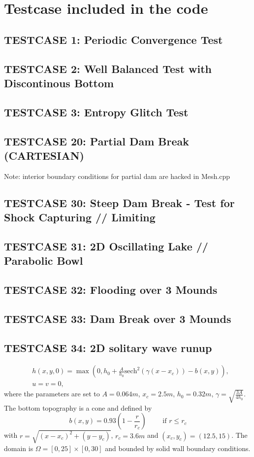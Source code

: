\documentclass[times,sort]{elsarticle}
\theoremstyle{plain}
\theoremstyle{proofpartstyle} \newtheorem*{proofpart}{Proof of Part}
\theoremstyle{plain}
\theoremstyle{remark}
\numberwithin{equation}{section}
\begin{document}
\section{Testcase included in the code}
\subsection{TESTCASE 1: Periodic Convergence Test}
\subsection{TESTCASE 2: Well Balanced Test with Discontinous Bottom}
\subsection{TESTCASE 3: Entropy Glitch Test}
\subsection{TESTCASE 20: Partial Dam Break (CARTESIAN)}
Note: interior boundary conditions for partial dam are hacked in Mesh.cpp
\subsection{TESTCASE 30: Steep Dam Break - Test for Shock Capturing // Limiting}
\subsection{TESTCASE 31: 2D Oscillating Lake // Parabolic Bowl}
\subsection{TESTCASE 32: Flooding over 3 Mounds}
\subsection{TESTCASE 33: Dam Break over 3 Mounds}
\subsection{TESTCASE 34: 2D solitary wave runup}
\begin{equation}
\begin{aligned}
&h(x,y,0)=\max \left( 0, h_0 + \frac{A}{h_0}  \text{sech}^2 (\gamma (x-x_c)) -b(x,y) \right),\\
&u=v=0,
\end{aligned}
\end{equation}
where the parameters are set to $A=0.064m$, $x_c = 2.5m$, $h_0 = 0.32m$, $\gamma = \sqrt{\frac{3A}{4h_0}}$. The bottom topography is a cone and defined by
\begin{equation}
b(x,y) = 0.93 \left(1-\frac{r}{r_c}\right)	\qquad \text{ if } r\leq r_c
\end{equation}
with $r=\sqrt{(x-x_c)^2 + (y-y_c)}$,  $r_c = 3.6m$ and $(x_c,y_c) = (12.5,15)$. The domain is $\Omega = [0,25] \times [0,30]$ and bounded by solid wall boundary conditions.
\end{document}
